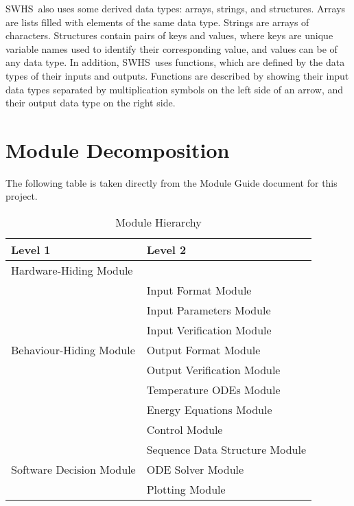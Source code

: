 \documentclass[12pt]{article}
\newcommand{\progname}{SWHS}
\begin{document}
\noindent
\progname \ also uses some derived data types: arrays, strings, and
structures. Arrays are lists filled with elements of the same data type. Strings
are arrays of characters. Structures contain pairs of keys and values, where
keys are unique variable names used to identify their corresponding value, and
values can be of any data type. In addition, \progname \ uses functions, which
are defined by the data types of their inputs and outputs. Functions are
described by showing their input data types separated by multiplication symbols
on the left side of an arrow, and their output data type on the right side.

\section{Module Decomposition}

The following table is taken directly from the Module Guide document for this project.

\begin{table}[!h]
	\centering
	\begin{tabular}{p{} p{}}
		\toprule
		\textbf{Level 1} & \textbf{Level 2}\\
		\midrule
		
		{Hardware-Hiding Module} & ~ \\
		\midrule
		
		\multirow{7}{0.3\textwidth}{Behaviour-Hiding Module} & Input Format Module\\
		& Input Parameters Module\\
		& Input Verification Module\\
		& Output Format Module\\
		& Output Verification Module\\
		& Temperature ODEs Module\\
		& Energy Equations Module\\ 
		& Control Module\\
		\midrule
		
		\multirow{3}{0.3\textwidth}{Software Decision Module} & {Sequence Data Structure Module}\\
		& ODE Solver Module\\
		& Plotting Module\\
		\bottomrule
		
	\end{tabular}
	\caption{Module Hierarchy}
	\label{TblMH}
\end{table}
\end{document}
